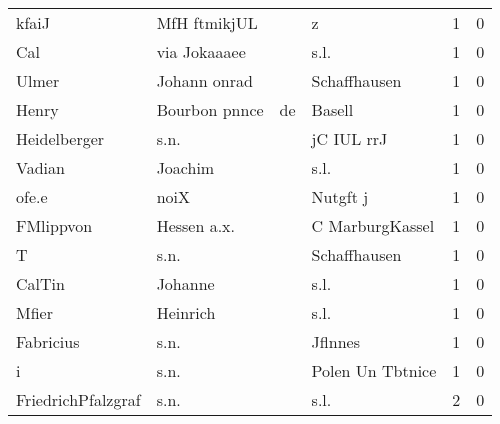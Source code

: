 \begin{tabular}{llllrr}
                    kfaiJ &                       MfH ftmikjUL &             &                                           z &          1 &         0 \\
                      Cal &                       via Jokaaaee &             &                                        s.l. &          1 &         0 \\
                    Ulmer &                       Johann onrad &             &                                Schaffhausen &          1 &         0 \\
                    Henry &                      Bourbon pnnce &          de &                                      Basell &          1 &         0 \\
             Heidelberger &                               s.n. &             &                                  jC IUL rrJ &          1 &         0 \\
                   Vadian &                            Joachim &             &                                        s.l. &          1 &         0 \\
                    ofe.e &                               noiX &             &                                    Nutgft j &          1 &         0 \\
                FMlippvon &                        Hessen a.x. &             &                             C MarburgKassel &          1 &         0 \\
                        T &                               s.n. &             &                                Schaffhausen &          1 &         0 \\
                   CalTin &                            Johanne &             &                                        s.l. &          1 &         0 \\
                    Mfier &                           Heinrich &             &                                        s.l. &          1 &         0 \\
                Fabricius &                               s.n. &             &                                     Jflnnes &          1 &         0 \\
                        i &                               s.n. &             &                            Polen Un Tbtnice &          1 &         0 \\
       FriedrichPfalzgraf &                               s.n. &             &                                        s.l. &          2 &         0 \\

\end{tabular}
